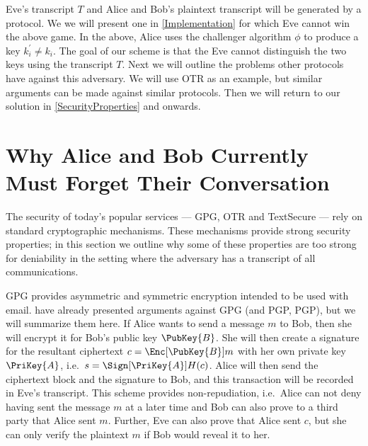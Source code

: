 Eve's transcript \(T\) and Alice and Bob's plaintext transcript will be 
generated by a protocol.
We we will present one in \cref{Implementation} for which Eve cannot 
win the above game.
In the above, Alice uses the challenger algorithm \(\phi\) to produce a key 
\(k_i^\prime\neq k_i\).
The goal of our scheme is that the Eve cannot distinguish the two keys using 
the transcript \(T\).
Next we will outline the problems other protocols have against this adversary.
We will use \ac{OTR} as an example, but similar arguments can be made against 
similar protocols.
Then we will return to our solution in \cref{SecurityProperties} and onwards.


\section{Why Alice and Bob Currently Must Forget Their Conversation}
\label{Undeniability}

The security of today's popular services --- \ac{GPG}, \ac{OTR} and TextSecure 
--- rely on standard cryptographic mechanisms.
These mechanisms provide strong security properties;
in this section we outline why some of these properties are too strong for 
deniability in the setting where the adversary has a transcript of all 
communications.

\ac{GPG} provides asymmetric and symmetric encryption intended to be used with 
email.
\citet{otr2004} have already presented arguments against \ac{GPG} (and 
\acl{PGP}, \acs{PGP}), but we will summarize them here.
If Alice wants to send a message \(m\) to Bob, then she will encrypt it for 
Bob's public key \(\PubKey{B}\).
She will then create a signature for the resultant ciphertext \(c 
  = \Enc[\PubKey{B}]{ m }\) with her own private key \(\PriKey{A}\), i.e.~\(s 
  = \Sign[\PriKey{A}]{ H(c) }\).
Alice will then send the ciphertext block and the signature to Bob, and this 
transaction will be recorded in Eve's transcript.
This scheme provides non-repudiation, i.e.~Alice can not deny having sent the 
message \(m\) at a later time and Bob can also prove to a third party that 
Alice sent \(m\).
Further, Eve can also prove that Alice sent \(c\), but she can only verify the 
plaintext \(m\) if Bob would reveal it to her.


